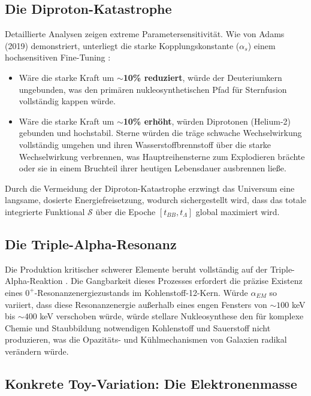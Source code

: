 \documentclass[12pt,a4paper]{article}
\theoremstyle{remark}
\begin{document}
\subsection{Die Diproton-Katastrophe}

Detaillierte Analysen zeigen extreme Parametersensitivit\"at. Wie von Adams (2019) demonstriert, unterliegt die starke Kopplungskonstante ($\alpha_s$) einem hochsensitiven Fine-Tuning \citep{Adams2019}:

\begin{itemize}
    \item W\"are die starke Kraft um \textbf{$\sim$10\% reduziert}, w\"urde der Deuteriumkern ungebunden, was den prim\"aren nukleosynthetischen Pfad f\"ur Sternfusion vollst\"andig kappen w\"urde.
    \item W\"are die starke Kraft um \textbf{$\sim$10\% erh\"oht}, w\"urden Diprotonen (Helium-2) gebunden und hochstabil. Sterne w\"urden die tr\"age schwache Wechselwirkung vollst\"andig umgehen und ihren Wasserstoffbrennstoff \"uber die starke Wechselwirkung verbrennen, was Hauptreihensterne zum Explodieren brächte oder sie in einem Bruchteil ihrer heutigen Lebensdauer ausbrennen lie\ss{}e.
\end{itemize}

Durch die Vermeidung der Diproton-Katastrophe erzwingt das Universum eine langsame, dosierte Energiefreisetzung, wodurch sichergestellt wird, dass das totale integrierte Funktional $\mathcal{S}$ \"uber die Epoche $[t_{BB}, t_\Lambda]$ global maximiert wird.

\subsection{Die Triple-Alpha-Resonanz}

Die Produktion kritischer schwerer Elemente beruht vollst\"andig auf der Triple-Alpha-Reaktion \citep{Adams2019}. Die Gangbarkeit dieses Prozesses erfordert die pr\"azise Existenz eines $0^+$-Resonanzenergiezustands im Kohlenstoff-12-Kern. W\"urde $\alpha_{EM}$ so variiert, dass diese Resonanzenergie au\ss{}erhalb eines engen Fensters von $\sim 100$ keV bis $\sim 400$ keV verschoben w\"urde, w\"urde stellare Nukleosynthese den f\"ur komplexe Chemie und Staubbildung notwendigen Kohlenstoff und Sauerstoff nicht produzieren, was die Opazit\"ats- und K\"uhlmechanismen von Galaxien radikal ver\"andern w\"urde.

\subsection{Konkrete Toy-Variation: Die Elektronenmasse}
\end{document}

